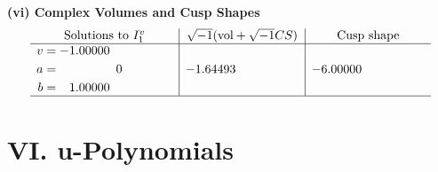 \documentclass[1p]{elsarticle_modified}
\theoremstyle{definition}
\newcommand{\I}{\sqrt{-1}}
\begin{document}
\newpage\flushleft \textbf{(vi) Complex Volumes and Cusp Shapes}
$$\begin{array}{c|c|c}  
\text{Solutions to }I^v_{1}& \I (\text{vol} + \sqrt{-1}CS) & \text{Cusp shape}\\
 \hline 
\begin{aligned}
v &= -1.00000\phantom{ +0.000000I} \\
a &= \phantom{-0.000000 } 0 \\
b &= \phantom{-}1.00000\phantom{ +0.000000I}\end{aligned}
 & -1.64493\phantom{ +0.000000I} & -6.00000\phantom{ +0.000000I}\\
 \hline 
 \end{array}$$\newpage
\newpage\renewcommand{\arraystretch}{1}
\centering \section*{ VI. u-Polynomials}
\end{document}
